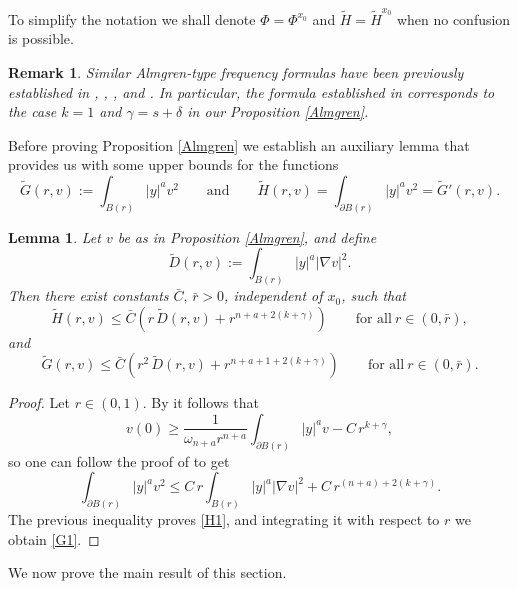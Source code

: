 \documentclass[11pt]{amsart}
\theoremstyle{plain}
\newtheorem{lemma}[thrm]{Lemma}
\newtheorem{rmrk}[thrm]{Remark}
\numberwithin{equation}{section}
\begin{document}
To simplify the notation we shall denote $\Phi=\Phi^{x_0}$ and $\tilde{H}=\tilde{H}^{x_0}$ when no confusion is possible.

\begin{rmrk}
Similar Almgren-type frequency formulas have been previously established in \cite{CSS}, \cite{GP}, \cite{BFR}, and \cite{CDS}.
In particular, the formula established in \cite[Theorem 6.2]{CDS} corresponds to the case $k=1$ and $\gamma=s+\delta$ in our Proposition \ref{Almgren}.
\end{rmrk}

Before proving Proposition \ref{Almgren} we establish an auxiliary lemma that provides us with some upper bounds for the functions
\begin{equation}\label{HG}
\tilde{G}(r,v):=\int_{B(r)}{|y|^{a}v^2 }
\qquad\mbox{and}\qquad   \tilde{H}(r,v)=\int_{\partial {B(r)}}{|y|^{a}v^2 }=\tilde{G}'(r,v).
\end{equation}

\begin{lemma}\label{auxiliar_frecuency}
Let $v$ be as in Proposition \ref{Almgren}, and define
\begin{equation}\label{D}
\tilde{D}(r,v):=\int_{B(r)}{|y|^{a}|\nabla v|^{2}}.
\end{equation}
Then there exist constants $\bar{C},\, \bar{r}>0$, independent of $x_0$, such that
\begin{equation}\label{H1}
\tilde{H}(r,v)\leq \bar{C}\left(r\,\tilde{D}(r,v)+ r^{n+a+2(k+\gamma)}\right)\qquad \textrm{for all}\ r\in (0,\bar{r}),
\end{equation}
and
\begin{equation}\label{G1}
\tilde{G}(r,v)\leq \bar{C}\left(r^2\,\tilde{D}(r,v)+ r^{n+a+1+2(k+\gamma)}\right)\qquad \textrm{for all}\ r\in (0,\bar{r}).
\end{equation}
\end{lemma}

\begin{proof}
Let $r\in(0,1)$.
By \cite[Lemma 2.9]{CSS} it follows that
$$v(0)\geq \frac{1}{\omega_{n+a}r^{n+a}}\int_{\partial {B(r)}}{|y|^{a} v}- C\, r^{k+\gamma},$$
so one can follow the proof of \cite[Lemma 2.13]{CSS} to get
$$
\int_{\partial {B(r)}}{|y|^{a} v^2}\leq C\, r\int_{B(r)}{|y|^{a}|\nabla v|^{2}}+ C \,r^{(n+a)+2(k+\gamma)}.
$$
The previous inequality proves \eqref{H1}, and integrating it with respect to $r$ we obtain \eqref{G1}.
\end{proof}

We now prove the main result of this section.
\end{document}
